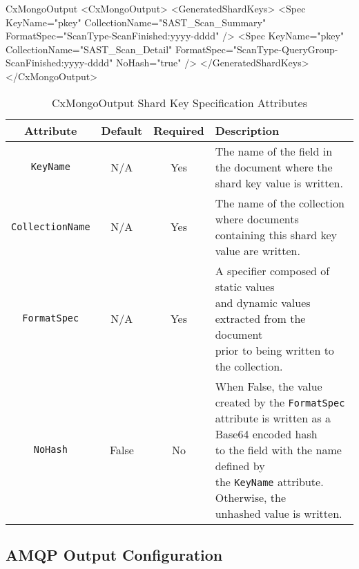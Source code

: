 \begin{xml}{CxMongoOutput}{\contentvariables}{}
<CxMongoOutput>
    <GeneratedShardKeys>
        <Spec 
            KeyName="pkey" 
            CollectionName="SAST_Scan_Summary" 
            FormatSpec="{ScanType}-{ScanFinished:yyyy-dddd}"
            />
        <Spec 
            KeyName="pkey" 
            CollectionName="SAST_Scan_Detail" 
            FormatSpec="{ScanType}-{QueryGroup}-{ScanFinished:yyyy-dddd}" 
            NoHash="true" 
            />
    </GeneratedShardKeys>
</CxMongoOutput>
\end{xml}
    

\begin{table}[h]
    \caption{CxMongoOutput Shard Key Specification Attributes}        
    \begin{tabularx}{\textwidth}{cccl}
        \toprule
        \textbf{Attribute} & \textbf{Default} & \textbf{Required} & \textbf{Description}\\
        \midrule
        \texttt{KeyName} & N/A & Yes & \makecell[l]{The name of the field in the document where the\\shard key value is written.}\\
        \midrule
        \texttt{CollectionName} & N/A & Yes & \makecell[l]{The name of the collection where documents\\
        containing this shard key value are written.}\\
        \midrule
        \texttt{FormatSpec} & N/A & Yes & \makecell[l]{A specifier composed of static values\\
        and dynamic values extracted from the document\\
        prior to being written to the collection.}\\
        \midrule
        \texttt{NoHash} & False & No & \makecell[l]{When False, the value created by the \texttt{FormatSpec}\\
        attribute is written as a Base64 encoded hash\\
        to the field with the name defined by\\
        the \texttt{KeyName} attribute.  Otherwise, the\\
        unhashed value is written.}\\
        \bottomrule
    \end{tabularx}
\end{table}


\subsection{AMQP Output Configuration}

